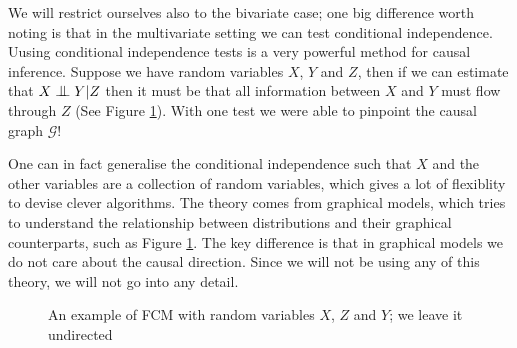 

We will restrict ourselves also to the bivariate case; one big difference worth noting is that in the
multivariate setting we can test conditional independence. Uusing conditional independence tests 
is a very powerful method for causal inference. Suppose 
we have random variables $X$, $Y$ and $Z$, then if we can estimate that $X \bigCI Y | Z$ then it must be 
that all information between $X$ and $Y$ must flow through $Z$ (See Figure \ref{fig:conditionalIndep}).
With one test we were able to pinpoint the causal graph $\mathcal{G}$! 

One can in fact generalise the conditional independence such that $X$ and the other variables are 
a collection of random variables, which gives a lot of flexiblity to devise clever algorithms. 
The theory comes from graphical models, which tries to understand the relationship between 
distributions and their graphical counterparts, such as Figure \ref{fig:conditionalIndep}.
The key difference is that in graphical models we do not care about the causal direction. 
Since we will not be using any of this theory, we will not go into any detail. 

\begin{figure}[!h]
    \centering

    \caption{An example of FCM with random variables $X$, $Z$ and $Y$; we leave it undirected}
    \label{fig:conditionalIndep}

\end{figure}

